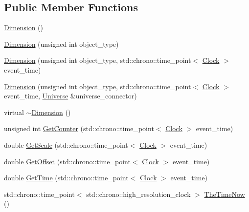 \subsection*{Public Member Functions}
\begin{DoxyCompactItemize}
\item 
\mbox{\hyperlink{classDimension_aa61dad15f33b6c3d09028ba9e545aa70}{Dimension}} ()
\item 
\mbox{\hyperlink{classDimension_a68def81e037c1bcc005591f45c53e3a3}{Dimension}} (unsigned int object\+\_\+type)
\item 
\mbox{\hyperlink{classDimension_ab48cbe6ca22404ab5a2c522498c38d7c}{Dimension}} (unsigned int object\+\_\+type, std\+::chrono\+::time\+\_\+point$<$ \mbox{\hyperlink{universe_8h_a0ef8d951d1ca5ab3cfaf7ab4c7a6fd80}{Clock}} $>$ event\+\_\+time)
\item 
\mbox{\hyperlink{classDimension_a9282c4669e8f97dce010324886d79a99}{Dimension}} (unsigned int object\+\_\+type, std\+::chrono\+::time\+\_\+point$<$ \mbox{\hyperlink{universe_8h_a0ef8d951d1ca5ab3cfaf7ab4c7a6fd80}{Clock}} $>$ event\+\_\+time, \mbox{\hyperlink{classUniverse}{Universe}} \&universe\+\_\+connector)
\item 
virtual \mbox{\hyperlink{classDimension_aa990dfd442020c193a1941e9dffbfbee}{$\sim$\+Dimension}} ()
\item 
unsigned int \mbox{\hyperlink{classDimension_a2fbee64eeea5de3d8eab10cf0fdb6363}{Get\+Counter}} (std\+::chrono\+::time\+\_\+point$<$ \mbox{\hyperlink{universe_8h_a0ef8d951d1ca5ab3cfaf7ab4c7a6fd80}{Clock}} $>$ event\+\_\+time)
\item 
double \mbox{\hyperlink{classDimension_a6985e3d8738202530cb2cd428b5b884c}{Get\+Scale}} (std\+::chrono\+::time\+\_\+point$<$ \mbox{\hyperlink{universe_8h_a0ef8d951d1ca5ab3cfaf7ab4c7a6fd80}{Clock}} $>$ event\+\_\+time)
\item 
double \mbox{\hyperlink{classDimension_a58009cd435ead4b7b2f395a11fda0ae8}{Get\+Offset}} (std\+::chrono\+::time\+\_\+point$<$ \mbox{\hyperlink{universe_8h_a0ef8d951d1ca5ab3cfaf7ab4c7a6fd80}{Clock}} $>$ event\+\_\+time)
\item 
double \mbox{\hyperlink{classDimension_ae0b4f856e62a70bb3dff96528315f3c9}{Get\+Time}} (std\+::chrono\+::time\+\_\+point$<$ \mbox{\hyperlink{universe_8h_a0ef8d951d1ca5ab3cfaf7ab4c7a6fd80}{Clock}} $>$ event\+\_\+time)
\item 
std\+::chrono\+::time\+\_\+point$<$ std\+::chrono\+::high\+\_\+resolution\+\_\+clock $>$ \mbox{\hyperlink{classDimension_ab39b7ff253ade59c5c2d807c511b4028}{The\+Time\+Now}} ()

\end{DoxyCompactItemize}
